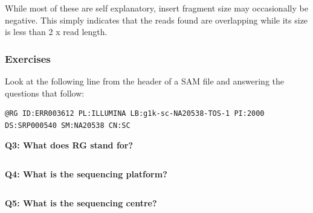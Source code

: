 \documentclass[11pt]{article}
\makeatletter
\newcommand{\boxspacing}{\kern\kvtcb@left@rule\kern\kvtcb@boxsep}
\newcommand{\prompt}[4]{
        {\ttfamily\llap{{\color{blue}\LARGE\faKeyboardO\hspace{3pt}#4}}\vspace{-\baselineskip}}
    }
\makeatother
\begin{document}
While most of these are self explanatory, insert fragment size may
occasionally be negative. This simply indicates that the reads found are
overlapping while its size is less than 2 x read length.

    \hypertarget{exercises}{%
\subsubsection{Exercises}\label{exercises}}

Look at the following line from the header of a SAM file and answering
the questions that follow:

\begin{verbatim}
@RG ID:ERR003612 PL:ILLUMINA LB:g1k-sc-NA20538-TOS-1 PI:2000 DS:SRP000540 SM:NA20538 CN:SC
\end{verbatim}

\textbf{Q3: What does RG stand for?}

    \begin{tcolorbox}[breakable, size=fbox, boxrule=1pt, pad at break*=1mm,colback=cellbackground, colframe=cellborder]
\prompt{In}{incolor}{ }{\boxspacing}
\begin{Verbatim}[commandchars=\\\{\}]

\end{Verbatim}
\end{tcolorbox}

    \textbf{Q4: What is the sequencing platform?}

    \begin{tcolorbox}[breakable, size=fbox, boxrule=1pt, pad at break*=1mm,colback=cellbackground, colframe=cellborder]
\prompt{In}{incolor}{ }{\boxspacing}
\begin{Verbatim}[commandchars=\\\{\}]

\end{Verbatim}
\end{tcolorbox}

    \textbf{Q5: What is the sequencing centre?}

    \begin{tcolorbox}[breakable, size=fbox, boxrule=1pt, pad at break*=1mm,colback=cellbackground, colframe=cellborder]
\prompt{In}{incolor}{ }{\boxspacing}
\begin{Verbatim}[commandchars=\\\{\}]

\end{Verbatim}
\end{tcolorbox}
\end{document}
